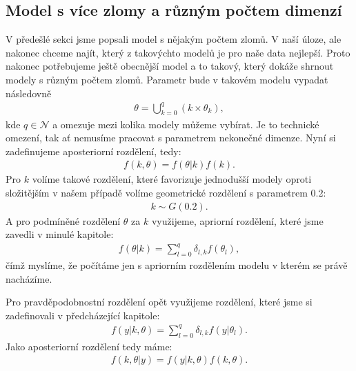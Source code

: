 \documentclass[czech,master,public,dept470,male,cpdeclaration,oneside, python]{diploma}
\begin{document}
\subsection{Model s více zlomy a různým počtem dimenzí}
V předešlé sekci jsme popsali model s nějakým počtem zlomů. V naší úloze, ale nakonec chceme najít, který z takovýchto modelů je pro naše data nejlepší. Proto nakonec potřebujeme ještě obecnější model a to takový, který dokáže shrnout modely s různým počtem zlomů. Parametr bude v takovém modelu vypadat následovně 
\begin{align}
\theta = \bigcup_{k=0}^q({k} \times \theta_k),
\end{align}
kde $q \in \mathcal{N}$ a omezuje mezi kolika modely můžeme vybírat. Je to technické omezení, tak ať nemusíme pracovat s parametrem nekonečné dimenze. Nyní si zadefinujeme aposteriorní rozdělení, tedy:
\begin{align}
f(k, \theta) = f(\theta | k)f(k).
\end{align}
Pro $k$ volíme takové rozdělení, které favorizuje jednodušší modely oproti složitějším v našem případě volíme geometrické rozdělení s parametrem 0.2:
\begin{align}
k \sim G(0.2).
\end{align}
A pro podmíněné rozdělení $\theta$ za $k$ využijeme, apriorní rozdělení, které jsme zavedli v minulé kapitole:
\begin{align}
f(\theta | k) = \sum_{l=0}^q \delta_{l, k} f(\theta_l),
\end{align}
čímž myslíme, že počítáme jen s apriorním rozdělením modelu v kterém se právě nacházíme. \par 
Pro pravděpodobnostní rozdělení opět využijeme rozdělení, které jsme si zadefinovali v předcházející kapitole:
\begin{align}
f(y | k, \theta) = \sum_{l=0}^q \delta_{l,k} f(y | \theta_l).
\end{align}
Jako aposteriorní rozdělení tedy máme:
\begin{align}\label{supermodel}
	f(k, \theta | y) = f(y | k, \theta)f(k, \theta).
\end{align}
\end{document}
